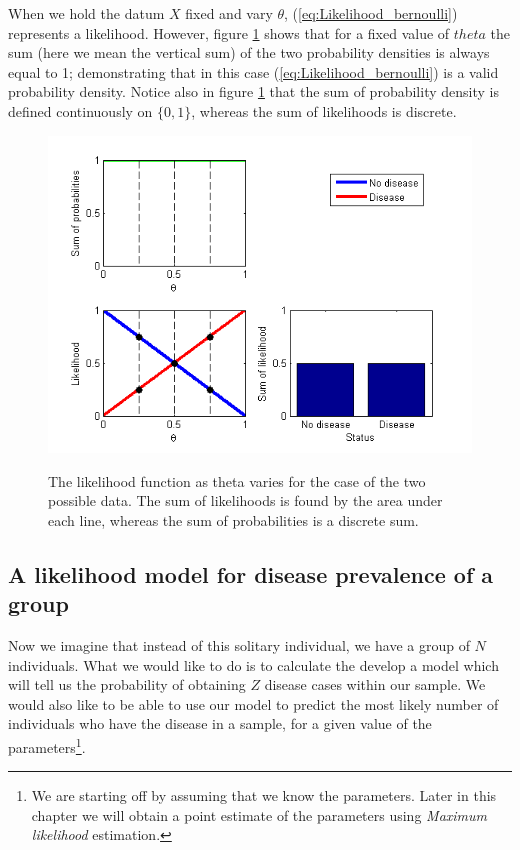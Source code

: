 \documentclass[11pt,fullpage]{book}
\begin{document}
When we hold the datum $X$ fixed and vary $\theta$, (\ref{eq:Likelihood_bernoulli}) represents a likelihood. However, figure \ref{fig:Likelihood_bernoulli} shows that for a fixed value of $theta$ the sum (here we mean the vertical sum) of the two probability densities is always equal to 1; demonstrating that in this case (\ref{eq:Likelihood_bernoulli}) is a valid probability density. Notice also in figure \ref{fig:Likelihood_bernoulli} that the sum of probability density is defined continuously on $\{0,1\}$, whereas the sum of likelihoods is discrete.

\begin{figure}
\centering
\scalebox{0.75} 
{\includegraphics{likelihood_bernoulli.png}}
\caption{The likelihood function as theta varies for the case of the two possible data. The sum of likelihoods is found by the area under each line, whereas the sum of probabilities is a discrete sum.}\label{fig:Likelihood_bernoulli}
\end{figure}

\subsection{A likelihood model for disease prevalence of a group}\label{sec:Likelihood_diseaseGroup}
Now we imagine that instead of this solitary individual, we have a group of $N$ individuals. What we would like to do is to calculate the develop a model which will tell us the probability of obtaining $Z$ disease cases within our sample. We would also like to be able to use our model to predict the most likely number of individuals who have the disease in a sample, for a given value of the parameters\footnote{We are starting off by assuming that we know the parameters. Later in this chapter we will obtain a point estimate of the parameters using \textit{Maximum likelihood} estimation.}. 
\end{document}
